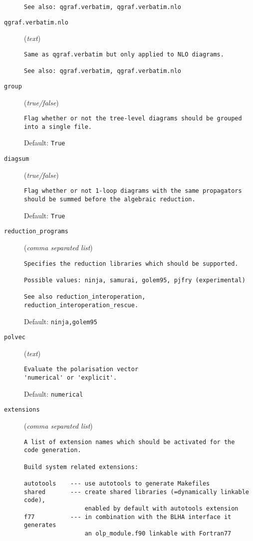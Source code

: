 \begin{description}
\begin{verbatim}
See also: qgraf.verbatim, qgraf.verbatim.nlo
\end{verbatim}
\item[\texttt{qgraf.verbatim.nlo}] (\textit{text})
\begin{verbatim}
Same as qgraf.verbatim but only applied to NLO diagrams.

See also: qgraf.verbatim, qgraf.verbatim.nlo
\end{verbatim}
\item[\texttt{group}] (\textit{true/false})
\begin{verbatim}
Flag whether or not the tree-level diagrams should be grouped
into a single file.
\end{verbatim}
Default: \verb|True|
\item[\texttt{diagsum}] (\textit{true/false})
\begin{verbatim}
Flag whether or not 1-loop diagrams with the same propagators
should be summed before the algebraic reduction.
\end{verbatim}
Default: \verb|True|
\item[\texttt{reduction\_programs}] (\textit{comma separated list})
\begin{verbatim}
Specifies the reduction libraries which should be supported.

Possible values: ninja, samurai, golem95, pjfry (experimental)

See also reduction_interoperation, reduction_interoperation_rescue.
\end{verbatim}
Default: \verb|ninja,golem95|
\item[\texttt{polvec}] (\textit{text})
\begin{verbatim}
Evaluate the polarisation vector
'numerical' or 'explicit'.
\end{verbatim}
Default: \verb|numerical|
\item[\texttt{extensions}] (\textit{comma separated list})
\begin{verbatim}
A list of extension names which should be activated for the
code generation.

Build system related extensions:

autotools    --- use autotools to generate Makefiles
shared       --- create shared libraries (=dynamically linkable code),
                 enabled by default with autotools extension
f77          --- in combination with the BLHA interface it generates
                 an olp_module.f90 linkable with Fortran77


\end{verbatim}
\end{description}
